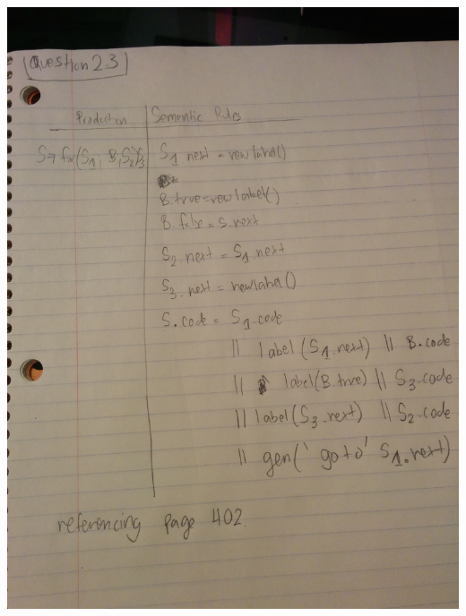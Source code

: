 \documentclass[11pt, oneside]{article}   	%
\begin{document}
\includegraphics[scale=0.15]{IMG_20141029_014044.jpg}
\end{document}
